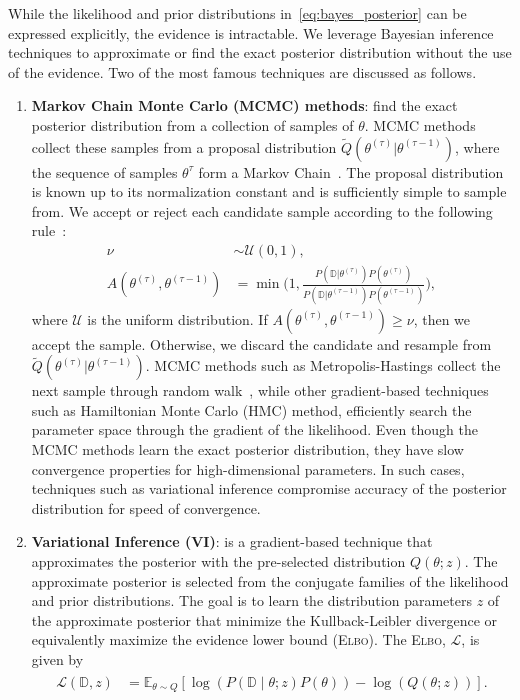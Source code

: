 While the likelihood and prior distributions in~\eqref{eq:bayes_posterior} can
be expressed explicitly, the evidence is intractable. We leverage Bayesian
inference techniques to approximate or find the exact posterior distribution
without the use of the evidence. Two of the most famous techniques are
discussed as follows.
\begin{enumerate}
  \item \textbf{Markov Chain Monte Carlo (MCMC) methods}: find the exact
  posterior distribution from a collection of samples of $\theta$.
  MCMC methods collect these samples from a proposal distribution
  $\tilde{Q}(\theta^{(\tau)} | \theta^{(\tau-1)})$, where the sequence of
  samples $\theta^\tau$ form a Markov Chain~\cite{bishop2006pattern}.
  The proposal distribution is known up to its normalization constant and is
  sufficiently simple to sample from. 
  We accept or reject each candidate sample according to the following rule~\cite{bishop2006pattern}:
  \begin{align*}
    \nu &\sim \mathcal{U}(0, 1), \\
    A(\theta^{(\tau)}, \theta^{(\tau-1)}) &= \min \Biggl(1, \frac{P(\mathbb{D} | \theta^{(\tau)})P(\theta^{(\tau)})}{P(\mathbb{D} | \theta^{(\tau-1)})P(\theta^{(\tau-1)})} \Biggr),
  \end{align*}
  \noindent where $\mathcal{U}$ is the uniform distribution. If
  $A(\theta^{(\tau)}, \theta^{(\tau-1)}) \geq \nu$, then we accept the sample. 
  Otherwise, we discard the candidate and resample from $\tilde{Q}(\theta^{(\tau)} |
  \theta^{(\tau-1)})$.
  MCMC methods such as Metropolis-Hastings collect the next sample through
  random walk~\cite{gilks1995markov}, while other gradient-based techniques such
  as Hamiltonian Monte Carlo (HMC) method, efficiently search the
  parameter space through the gradient of the likelihood.
  Even though the MCMC methods learn the exact posterior distribution, they have
  slow convergence properties for high-dimensional parameters. In such cases,
  techniques such as variational inference compromise accuracy of the posterior
  distribution for speed of convergence.
  
\item \textbf{Variational Inference (VI)}: is a gradient-based technique that approximates the posterior with the pre-selected
distribution $Q(\theta;z)$.
%
The approximate posterior is selected from the conjugate families of the likelihood and
prior distributions. The goal is to learn the distribution parameters $z$ of the approximate posterior that
minimize the Kullback-Leibler divergence or equivalently maximize the evidence
lower bound (\textsc{Elbo}). The \textsc{Elbo}, $\mathcal{L}$, is given
by~\cite{cohen2016bayesian}
\begin{align}
  \begin{split}
  \mathcal{L}(\mathbb{D},z) &= \mathbb{E}_{\theta \sim Q} \left[\log(P(\mathbb{D} \mid \theta;z)P(\theta)) - \log(Q(\theta;z)) \right].
  \end{split}
  \label{eq:elbo}
\end{align}
\end{enumerate}

